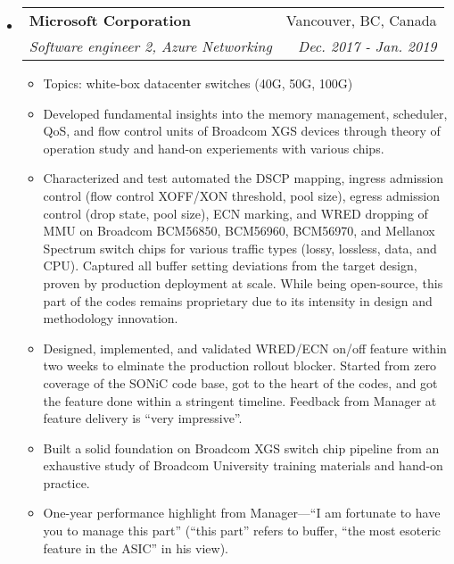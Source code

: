 \documentclass[letterpaper,11pt]{article}
\makeatletter
\newcommand{\ressubheading}[4]{
\begin{tabular*}{6.69in}{l@{\extracolsep{\fill}}r}
        \textbf{#1} & #2 \\
        \textit{#3} & \textit{#4} \\
\end{tabular*}\vspace{-6pt}
}
\newcommand{\resitem}[1]{\item #1 \vspace{-2pt}}
\makeatother
\begin{document}
\begin{itemize}
\item
  \ressubheading{Microsoft Corporation}{Vancouver, BC, Canada}
  {Software engineer 2, Azure Networking}{Dec. 2017 - Jan. 2019}
  \begin{itemize}
  \resitem{Topics: white-box datacenter switches (40G, 50G, 100G)}
  \resitem{Developed fundamental insights into the memory management, scheduler, QoS, and flow control units of Broadcom XGS devices
  through theory of operation study and hand-on experiements with various chips.}
  \resitem{Characterized and test automated the DSCP mapping, ingress admission control (flow control XOFF/XON threshold, pool size),
  egress admission control (drop state, pool size), ECN marking, and WRED dropping of MMU
  on Broadcom BCM56850, BCM56960, BCM56970, and Mellanox Spectrum switch chips
  for various traffic types (lossy, lossless, data, and CPU).
  Captured all buffer setting deviations from the target design, proven by production deployment at scale.
  While being open-source, this part of the codes remains proprietary due to its intensity in design and methodology innovation.}
  \resitem{Designed, implemented, and validated WRED/ECN on/off feature within two weeks to elminate the production rollout blocker.
  Started from zero coverage of the SONiC code base, got to the heart of the codes, and got the feature done within a stringent timeline.
  Feedback from Manager at feature delivery is ``very impressive''.}
  \resitem{Built a solid foundation on Broadcom XGS switch chip pipeline from an exhaustive study of Broadcom University training materials
  and hand-on practice.}
  \resitem{One-year performance highlight from Manager---``I am fortunate to have you to manage this part''
  (``this part'' refers to buffer, ``the most esoteric feature in the ASIC'' in his view).}
  \end{itemize}


\end{itemize}
\end{document}
